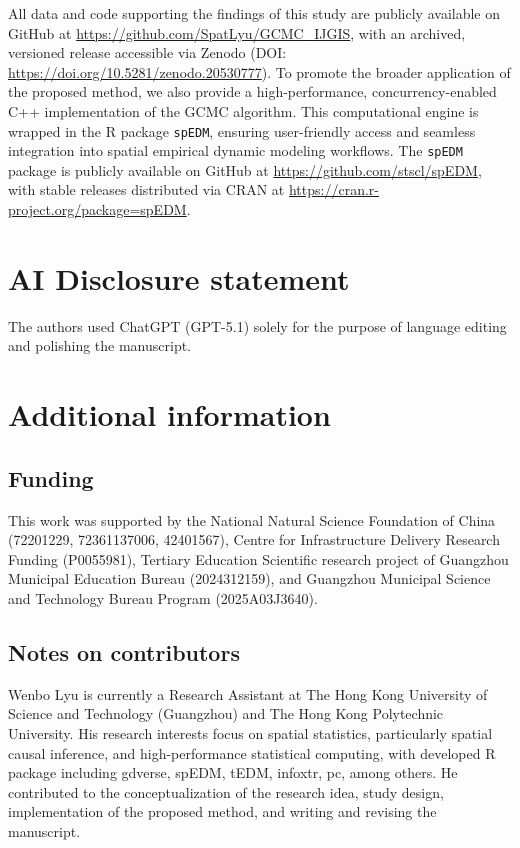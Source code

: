 \documentclass[authoryear,preprint,review,12pt]{elsarticle}
\begin{document}
All data and code supporting the findings of this study are publicly available on GitHub at \url{https://github.com/SpatLyu/GCMC_IJGIS}, with an archived, versioned release accessible via Zenodo (DOI: \url{https://doi.org/10.5281/zenodo.20530777}). To promote the broader application of the proposed method, we also provide a high-performance, concurrency-enabled C++ implementation of the GCMC algorithm. This computational engine is wrapped in the R package \texttt{spEDM}, ensuring user-friendly access and seamless integration into spatial empirical dynamic modeling workflows. The \texttt{spEDM} package is publicly available on GitHub at \url{https://github.com/stscl/spEDM}, with stable releases distributed via CRAN at \url{https://cran.r-project.org/package=spEDM}.

\section*{AI Disclosure statement}

The authors used ChatGPT (GPT-5.1) solely for the purpose of language editing and polishing the manuscript.

\section*{Additional information}

\subsection*{Funding}

This work was supported by the National Natural Science Foundation of China (72201229, 72361137006, 42401567), Centre for Infrastructure Delivery Research Funding (P0055981), Tertiary Education Scientific research project of Guangzhou Municipal Education Bureau (2024312159), and Guangzhou Municipal Science and Technology Bureau Program (2025A03J3640).

\subsection*{Notes on contributors}

Wenbo Lyu is currently a Research Assistant at The Hong Kong University of Science and Technology (Guangzhou) and The Hong Kong Polytechnic University. His research interests focus on spatial statistics, particularly spatial causal inference, and high-performance statistical computing, with developed R package including gdverse, spEDM, tEDM, infoxtr, pc, among others. He contributed to the conceptualization of the research idea, study design, implementation of the proposed method, and writing and revising the manuscript.
\end{document}
